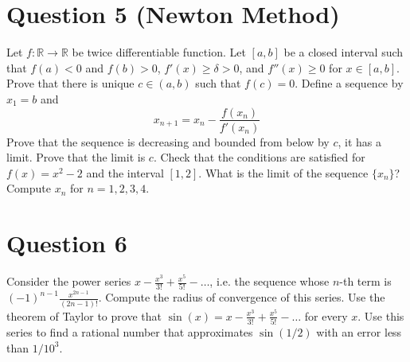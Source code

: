 \documentclass[12pt, letterpaper]{article}
\begin{document}
\section*{Question 5 (Newton Method)}
Let $f: \mathbb R \rightarrow \mathbb R$ be twice differentiable function. Let $[a,b]$ be a closed interval such that $f(a) <0$ and $f(b)>0$, $f'(x) \geq \delta>0$,
and $f''(x)\geq 0$ for $x\in [a,b]$. Prove that there is unique $c\in (a,b)$ such that $f(c)=0$. Define a sequence by $x_1=b$ and
\[
x_{n+1} = x_n -\frac{f(x_n)}{f'(x_{n})}
\]
Prove that the sequence is decreasing and bounded from below by $c$, it has a limit.
Prove that the limit is $c$.  Check that the conditions are
satisfied for $f(x)=x^2-2$ and the interval
$[1,2]$. What is the limit of the sequence $\{x_n\}$? Compute $x_n$  for $n=1,2,3,4$.
\section*{Question 6}
Consider the power series $x-\frac{x^3}{3!} + \frac{x^5}{5!} - \ldots$, i.e. the sequence whose $n$-th term is $(-1)^{n-1}\frac{x^{2n-1}}{(2n-1)!}$. Compute the
radius of convergence of this series. Use the theorem of Taylor to prove that $\sin(x)=x-\frac{x^3}{3!} + \frac{x^5}{5!} - \ldots$ for every $x$.
Use this series to find a rational number that approximates $\sin(1/2)$ with an error less than $1/10^3$.
\end{document}
